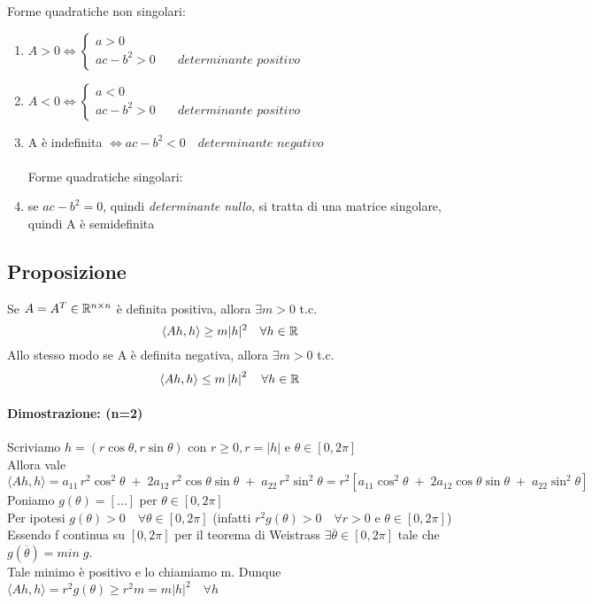 \documentclass[12pt]{article}
\begin{document}
Forme quadratiche non singolari:
\begin{enumerate}
    \item $A > 0 \Leftrightarrow
              \begin{cases}
                  a > 0                                             \\
                  ac-b^2 > 0 & \quad \textit{determinante positivo}
              \end{cases} $
    \item $A < 0 \Leftrightarrow
              \begin{cases}
                  a < 0                                             \\
                  ac-b^2 > 0 & \quad \textit{determinante positivo}
              \end{cases} $
    \item A è indefinita $\Leftrightarrow ac-b^2<0 \quad \textit{determinante negativo}$
          \\
          \\Forme quadratiche singolari:
    \item se $ac-b^2 = 0$, quindi \textit{determinante nullo}, si tratta di una matrice singolare, quindi A è semidefinita
\end{enumerate}

\subsection{Proposizione}

Se $A = A^T \in \mathbb{R}^{n\times n}$ è definita positiva,
allora $\exists m >0$ t.c. $$\langle Ah, h\rangle \geq m \lvert h \rvert ^2 \quad \forall h \in \mathbb{R}$$
Allo stesso modo se A è definita negativa, allora $\exists m >0$ t.c. $$\langle Ah, h\rangle \leq m \left\lvert h \right\rvert ^2 \quad \forall h \in \mathbb{R}$$

\paragraph*{Dimostrazione: (n=2)}
Scriviamo $h=(r\cos\theta , r\sin\theta)$ con $r\geq 0, r = \lvert h\rvert$ e $\theta \in [0, 2\pi]$\\
Allora vale $\langle Ah, h\rangle = a_{11}\,r^2\cos^2 \theta\;+\; 2a_{12}\,r^2\cos\theta\sin\theta\;+\;a_{22}\,r^2\sin^2\theta = r^2[a_{11}\cos^2 \theta\;+\; 2a_{12}\cos\theta\sin\theta\;+\;a_{22}\sin^2\theta]$\\
Poniamo $g(\theta) = [\dots]$ per $\theta \in [0, 2\pi]$\\
Per ipotesi $g(\theta) > 0 \quad \forall \theta \in [0, 2\pi]$ (infatti $r^2g(\theta)>0 \quad \forall r>0$ e $\theta \in [0, 2\pi]$)\\
Essendo f continua su $[0, 2\pi]$ per il teorema di Weistrass $\exists \overline{\theta} \in [0, 2\pi]$ tale che $g(\overline{\theta}) = min\;g$.\\
Tale minimo è positivo e lo chiamiamo m. Dunque $\langle Ah, h\rangle = r^2g(\theta) \geq r^2m = m \lvert h \rvert^2 \quad \forall h$\\
\end{document}
